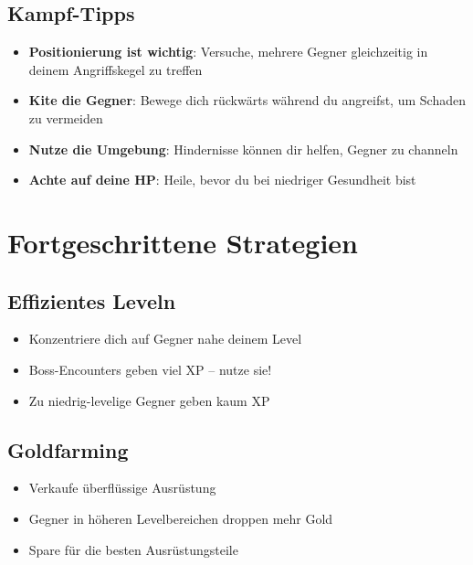 \documentclass[
  a4paper,
  11pt,
  ngerman,
  parskip=half,
  bibliography=totoc,
  listof=totoc
]{scrreprt}
\begin{document}
\subsection{Kampf-Tipps}

\begin{itemize}
    \item \textbf{Positionierung ist wichtig}: Versuche, mehrere Gegner gleichzeitig in deinem Angriffskegel zu treffen

    \item \textbf{Kite die Gegner}: Bewege dich rückwärts während du angreifst, um Schaden zu vermeiden

    \item \textbf{Nutze die Umgebung}: Hindernisse können dir helfen, Gegner zu channeln

    \item \textbf{Achte auf deine \ac{HP}}: Heile, bevor du bei niedriger Gesundheit bist
\end{itemize}

\section{Fortgeschrittene Strategien}

\subsection{Effizientes Leveln}

\begin{itemize}
    \item Konzentriere dich auf Gegner nahe deinem Level
    \item Boss-Encounters geben viel \ac{XP} -- nutze sie!
    \item Zu niedrig-levelige Gegner geben kaum \ac{XP}
\end{itemize}

\subsection{Goldfarming}

\begin{itemize}
    \item Verkaufe überflüssige Ausrüstung
    \item Gegner in höheren Levelbereichen droppen mehr Gold
    \item Spare für die besten Ausrüstungsteile
\end{itemize}
\end{document}
